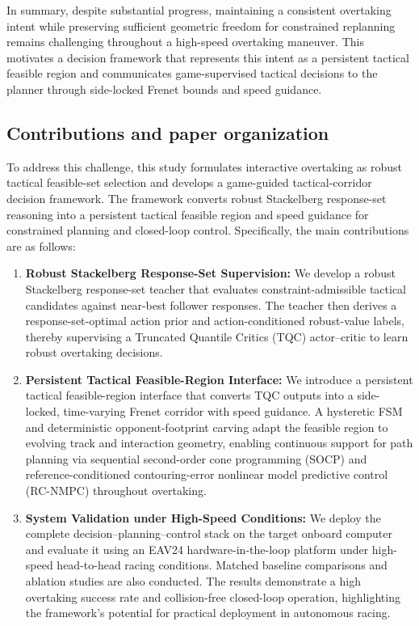 \documentclass[journal,twoside,web]{ieeecolor}
\begin{document}
In summary, despite substantial progress, maintaining a consistent overtaking
intent while preserving sufficient geometric freedom for constrained
replanning remains challenging throughout a high-speed overtaking maneuver.
This motivates a decision framework that represents this intent as a persistent
tactical feasible region and communicates game-supervised tactical decisions
to the planner through side-locked Frenet bounds and speed guidance.

\subsection{Contributions and paper organization}

To address this challenge, this study formulates interactive overtaking as
robust tactical feasible-set selection and develops a game-guided
tactical-corridor decision framework. The framework converts robust Stackelberg
response-set reasoning into a persistent tactical feasible region and speed
guidance for constrained planning and closed-loop control. Specifically, the
main contributions are as follows:

\begin{enumerate}

\item \textbf{Robust Stackelberg Response-Set Supervision:}
We develop a robust Stackelberg response-set teacher that evaluates constraint-admissible tactical candidates against near-best follower responses. The teacher then derives a response-set-optimal action prior and action-conditioned robust-value labels, thereby supervising a Truncated Quantile Critics (TQC) actor--critic to learn robust overtaking decisions.

\item \textbf{Persistent Tactical Feasible-Region Interface:}
We introduce a persistent tactical feasible-region interface that converts TQC outputs into a side-locked, time-varying Frenet corridor with speed guidance. 
A hysteretic FSM and deterministic opponent-footprint carving adapt the feasible region to evolving track and interaction geometry, enabling continuous support for path planning via sequential second-order cone programming (SOCP) and reference-conditioned contouring-error nonlinear model predictive control (RC-NMPC) throughout overtaking.


\item \textbf{System Validation under High-Speed Conditions:}
We deploy the complete decision--planning--control stack on the target onboard computer and evaluate it using an EAV24 hardware-in-the-loop platform under high-speed head-to-head racing conditions. Matched baseline comparisons and ablation studies are also conducted. The results demonstrate a high overtaking success rate and collision-free closed-loop operation, highlighting the framework's potential for practical deployment in autonomous racing.

\end{enumerate}
\end{document}
